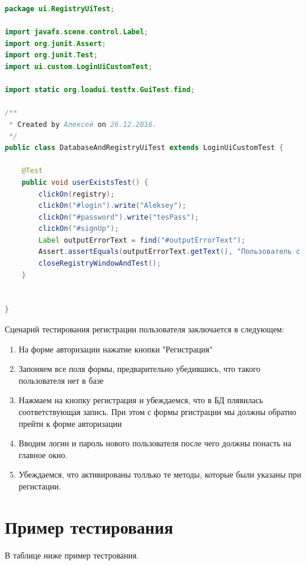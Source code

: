 \documentclass[a4paper,12pt]{article}
\begin{document}
\begin{lstlisting}[language=java, caption=код модуля DatabaseAndRegistryUiTest.java, label=lstlisting_database:test_ui]
package ui.RegistryUiTest;

import javafx.scene.control.Label;
import org.junit.Assert;
import org.junit.Test;
import ui.custom.LoginUiCustomTest;

import static org.loadui.testfx.GuiTest.find;

/**
 * Created by Алексей on 26.12.2016.
 */
public class DatabaseAndRegistryUiTest extends LoginUiCustomTest {

    @Test
    public void userExistsTest() {
        clickOn(registry);
        clickOn("#login").write("Aleksey");
        clickOn("#password").write("tesPass");
        clickOn("#signUp");
        Label outputErrorText = find("#outputErrorText");
        Assert.assertEquals(outputErrorText.getText(), "Пользователь с логином: Aleksey существует!");
        closeRegistryWindowAndTest();
    }


}
\end{lstlisting}

\par Сценарий тестирования регистрации пользователя заключается в следующем:
\begin{enumerate}
\item На форме авторизации нажатие кнопки "Регистрация"
\item Запоняем все поля формы, предварительно убедившись, что такого пользователя нет в базе
\item Нажмаем на кнопку регистрация и убеждаемся, что в БД плявилась соответствующая запись. При этом с формы ргистрации мы должны обратно прейти к форме авторизации
\item Вводим логин и пароль нового пользователя после чего должны понасть на главное окно.
\item Убеждаемся, что активированы толлько те методы, которые были указаны при регистации.
\end{enumerate}

\newpage \section{Пример тестирования}

В таблице ниже пример тестрования.
\end{document}
